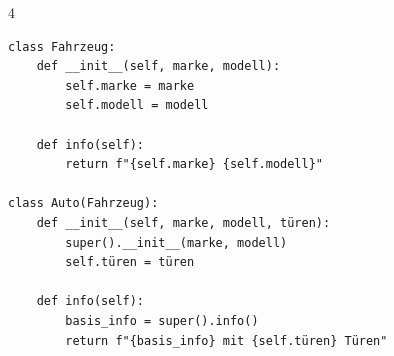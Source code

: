 \begin{landscape}
\begin{multicols*}{4}
		\begin{cheatSheetBox}[title=Vererbung]
			\begin{lstlisting}
class Fahrzeug:
    def __init__(self, marke, modell):
        self.marke = marke
        self.modell = modell
    
    def info(self):
        return f"{self.marke} {self.modell}"

class Auto(Fahrzeug):
    def __init__(self, marke, modell, türen):
        super().__init__(marke, modell)
        self.türen = türen
    
    def info(self):
        basis_info = super().info()
        return f"{basis_info} mit {self.türen} Türen"
\end{lstlisting}
		\end{cheatSheetBox}

	\end{multicols*}
\end{landscape}
\clearpage

